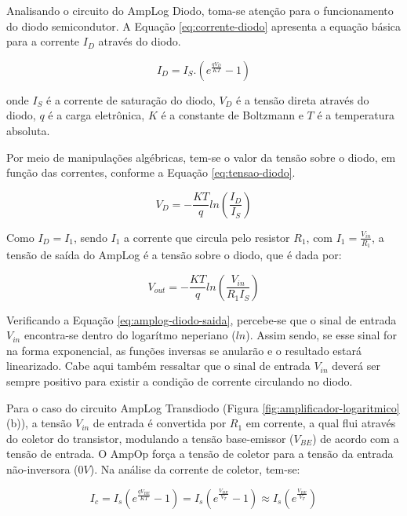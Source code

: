 \documentclass[a4paper]{instrumentacao}
\begin{document}
Analisando o circuito do AmpLog Diodo, toma-se atenção para o funcionamento do diodo semicondutor. A Equação \ref{eq:corrente-diodo} apresenta a equação básica para a corrente $I_D$ através do diodo.

\begin{equation}
	I_D=I_S.(e^{\frac{q V_D}{K T}}-1)
	\label{eq:corrente-diodo}
\end{equation}

\noindent
onde $I_S$ é a corrente de saturação do diodo, $V_D$ é a tensão direta através do diodo, $q$ é a carga eletrônica, $K$ é a constante de Boltzmann e $T$ é a temperatura absoluta.

Por meio de manipulações algébricas, tem-se o valor da tensão sobre o diodo, em função das correntes, conforme a Equação \ref{eq:tensao-diodo}.

\begin{equation}
	V_D= -\frac{KT}{q} ln\left ( \frac{I_D}{I_S} \right )
	\label{eq:tensao-diodo}
\end{equation}

Como $I_D=I_1$, sendo $I_1$ a corrente que circula pelo resistor $R_1$, com $I_1=\frac{V_{in}}{R_1}$, a tensão de saída do AmpLog é a tensão sobre o diodo, que é dada por:

\begin{equation}
	V_{out}= -\frac{KT}{q} ln\left ( \frac{V_{in}}{R_1 I_S} \right )
	\label{eq:amplog-diodo-saida}
\end{equation}

Verificando a Equação \ref{eq:amplog-diodo-saida}, percebe-se que o sinal de entrada $V_{in}$ encontra-se dentro do logarítmo neperiano ($ln$). Assim sendo, se esse sinal for na forma exponencial, as funções inversas se anularão e o resultado estará linearizado. Cabe aqui também ressaltar que o sinal de entrada $V_{in}$ deverá ser sempre positivo para existir a condição de corrente circulando no diodo.

Para o caso do circuito AmpLog Transdiodo (Figura \ref{fig:amplificador-logaritmico} (b)), a tensão $V_{in}$ de entrada é convertida por $R_1$ em corrente, a qual flui através do coletor do transistor, modulando a tensão base-emissor ($V_{BE}$) de acordo com a tensão de entrada. O AmpOp força a tensão de coletor para a tensão da entrada não-inversora ($0V$). Na análise da corrente de coletor, tem-se:

\begin{equation}
	I_c=I_s(e^{\frac{q V_{BE}}{KT}}-1)=I_s(e^{\frac{V_{BE}}{V_T}}-1)\approx I_s(e^{\frac{V_{BE}}{V_T}})
	\label{eq:amplog-transdiodo-corrente}
\end{equation}
\end{document}
